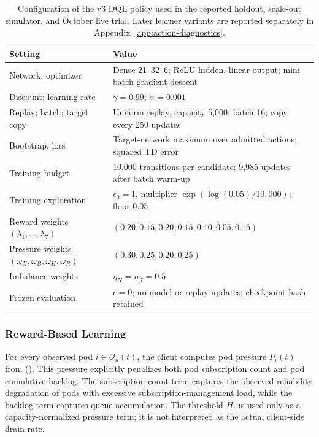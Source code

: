 \begin{table}[!htbp]
\centering\small
\caption{Configuration of the v3 DQL policy used in the reported holdout,
scale-out simulator, and October live trial. Later learner variants are
reported separately in Appendix~\ref{app:action-diagnostics}.}
\label{tab:dql-configuration}
\begin{tabular}{p{}p{}}
\toprule
Setting & Value\\
\midrule
Network; optimizer & Dense 21--32--6; ReLU hidden, linear output; mini-batch gradient descent\\
Discount; learning rate & $\gamma=0.99$; $\alpha=0.001$\\
Replay; batch; target copy & Uniform replay, capacity 5,000; batch 16; copy every 250 updates\\
Bootstrap; loss & Target-network maximum over admitted actions; squared TD error\\
Training budget & 10,000 transitions per candidate; 9,985 updates after batch warm-up\\
Training exploration & $\epsilon_0=1$, multiplier $\exp(\log(0.05)/10{,}000)$; floor 0.05\\
Reward weights $(\lambda_1,\ldots,\lambda_7)$ & $(0.20,0.15,0.20,0.15,0.10,0.05,0.15)$\\
Pressure weights $(\omega_X,\omega_B,\omega_H,\omega_R)$ & $(0.30,0.25,0.20,0.25)$\\
Imbalance weights & $\eta_N=\eta_G=0.5$\\
Frozen evaluation & $\epsilon=0$; no model or replay updates; checkpoint hash retained\\
\bottomrule
\end{tabular}
\end{table}

\subsubsection{Reward-Based Learning}

For every observed pod $i\in\mathcal{O}_u(t)$, the client computes pod pressure
$P_i(t)$ from (). This pressure explicitly penalizes both
pod subscription count and pod cumulative backlog. The subscription-count term
captures the observed reliability degradation of pods with excessive
subscription-management load, while the backlog term captures queue
accumulation. The threshold $H_i$ is used only as a capacity-normalized pressure
term; it is not interpreted as the actual client-side drain rate.

